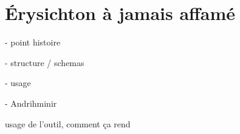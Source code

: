 \chapter{Érysichton à jamais affamé}
\label{chap:erysichtonUsage}


- point histoire

- structure / schemas

- usage

- Andrihminir

usage de l'outil, comment ça rend


